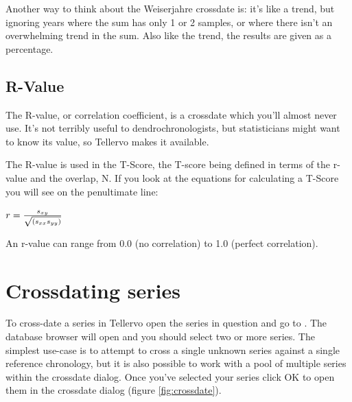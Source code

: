 Another way to think about the Weiserjahre crossdate is: it's like a trend, but ignoring years where the sum has only 1 or 2 samples, or where there isn't an overwhelming trend in the sum. Also like the trend, the results are given as a percentage.


\subsection{R-Value}
The R-value, or correlation coefficient, is a crossdate which you'll almost never use. It's not terribly useful to dendrochronologists, but statisticians might want to know its value, so Tellervo makes it available.

The R-value is used in the T-Score, the T-score being defined in terms of the r-value and the overlap, N. If you look at the equations for calculating a T-Score you will see on the penultimate line: 

\begin{itemize*}
 \item $r = {s_{xy} \over \sqrt{(s_{xx} s_{yy})}}$
\end{itemize*}

An r-value can range from 0.0 (no correlation) to 1.0 (perfect correlation). 
 

\section{Crossdating series}


To cross-date a series in Tellervo open the series in question and go to .  The database browser will open and you should select two or more series.  The simplest use-case is to attempt to cross a single unknown series against a single reference chronology, but it is also possible to work with a pool of multiple series within the crossdate dialog.  Once you've selected your series click OK to open them in the crossdate dialog (figure \ref{fig:crossdate}).  

